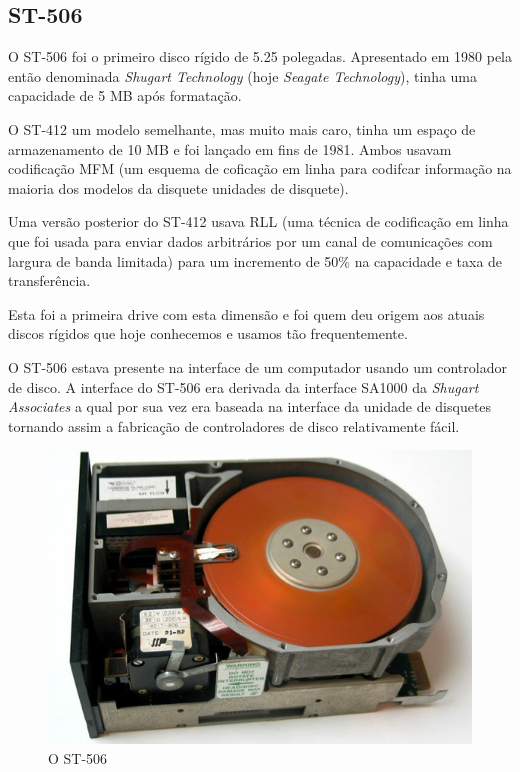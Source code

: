\documentclass{report}
\begin{document}
\newpage
		
		\subsection{ST-506}

	O ST-506 foi o primeiro disco rígido de 5.25 polegadas. Apresentado em 1980 pela então denominada \textit{Shugart Technology} (hoje \textit{Seagate Technology}), tinha uma capacidade de 5 MB após formatação. 
\vspace{1mm}

	O ST-412 um modelo semelhante, mas muito mais caro, tinha um espaço de armazenamento de 10 MB e foi lançado em fins de 1981. Ambos usavam codificação MFM (um esquema de coficação em linha para codifcar informação na maioria dos modelos da disquete unidades de disquete).
\vspace{1mm}
	
	Uma versão posterior do ST-412 usava RLL (uma técnica de codificação em linha que foi usada para enviar dados arbitrários por um canal de comunicações com largura de banda limitada) para um incremento de 50\% na capacidade e taxa de transferência.
\vspace{1mm}
	
	Esta foi a primeira drive com esta dimensão e foi quem deu origem aos atuais discos rígidos que hoje conhecemos e usamos tão frequentemente.
\vspace{1mm}

	O ST-506 estava presente na interface de um computador usando um controlador de disco. A interface do ST-506 era derivada da interface SA1000 da \textit{Shugart Associates}  a qual por sua vez era baseada na interface da unidade de disquetes tornando assim a fabricação de controladores de disco relativamente fácil.
\vspace{1mm}

	\begin{figure} [h]
		\centering
		\includegraphics[scale=0.3]{st-506.jpg}
		\caption{O ST-506}
	\end{figure}		
\newpage
\end{document}

